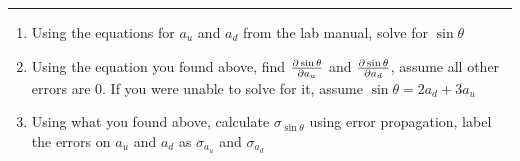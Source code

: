 \documentclass[11pt]{article}
\begin{document}
\Large

\medskip\hrule\bigskip\bigskip
{}
\begin{enumerate}

\item Using the equations for $a_u$ and $a_d$ from the lab manual, solve for $\sin\theta$
  \vspace*{0.27\textheight}
\item Using the equation you found above, find $\pdv{\sin\theta}{a_u}$ and $\pdv{\sin\theta}{a_d}$, assume all other errors are 0. If you were unable to solve for it, assume $\sin\theta=2a_d+3a_u$
  \vspace*{0.27\textheight}
\item Using what you found above, calculate $\sigma_{\sin\theta}$ using error propagation, label the errors on $a_u$ and $a_d$ as $\sigma_{a_u}$ and $\sigma_{a_d}$
  
\end{enumerate}
\end{document}
